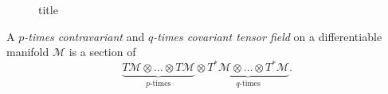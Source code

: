 \begin{figure}[H]
	\centering
	\caption{title}
	\label{fig:vector-bundle}
\end{figure}

\begin{definition}
	A \emph{\(p\)-times contravariant} and \emph{\(q\)-times covariant tensor field} on a differentiable manifold \(\mathcal{M} \) is a section of
	\[
		\underbrace{T\mathcal{M} \otimes \ldots \otimes T\mathcal{M}}_{\text{\(p\)-times}} \otimes \underbrace{T^{\ast} \mathcal{M} \otimes \ldots \otimes T^{\ast} \mathcal{M}}_{\text{\(q\)-times}}.
	\]
\end{definition}